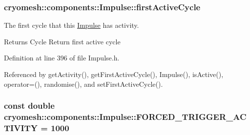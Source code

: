 \hypertarget{classcryomesh_1_1components_1_1Impulse_a1e60e9449535dde78c2a342b873022f7}{
\subsubsection[{first\-Active\-Cycle}]{ {\bf cryomesh\-::components\-::\-Impulse\-::first\-Active\-Cycle}}}\label{classcryomesh_1_1components_1_1Impulse_a1e60e9449535dde78c2a342b873022f7}


\-The first cycle that this \hyperlink{classcryomesh_1_1components_1_1Impulse}{\-Impulse} has activity. 

\begin{DoxyReturn}{\-Returns}
\-Cycle \-Return first active cycle 
\end{DoxyReturn}


\-Definition at line 396 of file \-Impulse.\-h.



\-Referenced by get\-Activity(), get\-First\-Active\-Cycle(), \-Impulse(), is\-Active(), operator=(), randomise(), and set\-First\-Active\-Cycle().

\hypertarget{classcryomesh_1_1components_1_1Impulse_aa581812f8f38b8a08d6f9ec9d301c455}{
\subsubsection[{\-F\-O\-R\-C\-E\-D\-\_\-\-T\-R\-I\-G\-G\-E\-R\-\_\-\-A\-C\-T\-I\-V\-I\-T\-Y}]{\setlength{\rightskip}{0pt plus 5cm}const double {\bf cryomesh\-::components\-::\-Impulse\-::\-F\-O\-R\-C\-E\-D\-\_\-\-T\-R\-I\-G\-G\-E\-R\-\_\-\-A\-C\-T\-I\-V\-I\-T\-Y} = 1000}}\label{classcryomesh_1_1components_1_1Impulse_aa581812f8f38b8a08d6f9ec9d301c455}


